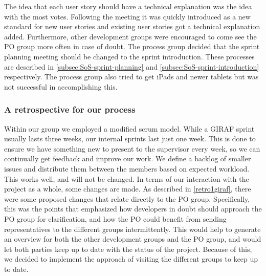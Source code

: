 The idea that each user story should have a technical explanation was the idea with the most votes. 
Following the meeting it was quickly introduced as a new standard for new user stories and existing user stories got a technical explanation added.
Furthermore, other development groups were encouraged to come see the PO group more often in case of doubt.
The process group decided that the sprint planning meeting should be changed to the sprint introduction.
These processes are described in \autoref{subsec:SoS-sprint-planning} and \autoref{subsec:SoS-sprint-introduction} respectively.
The process group also tried to get iPads and newer tablets but was not successful in accomplishing this.

\subsubsection{A retrospective for our process}
Within our group we employed a modified scrum model.
While a GIRAF sprint usually lasts three weeks, our internal sprints last just one week.
This is done to ensure we have something new to present to the supervisor every week, so we can continually get feedback and improve our work.
We define a backlog of smaller issues and distribute them between the members based on expected workload.
This works well, and will not be changed.
In terms of our interaction with the project as a whole, some changes are made.
As described in \autoref{retro1giraf}, there were some proposed changes that relate directly to the PO group.
Specifically, this was the points that emphasized how developers in doubt should approach the PO group for clarification, and how the PO could benefit from sending representatives to the different groups intermittently. 
This would help to generate an overview for both the other development groups and the PO group, and would let both parties keep up to date with the status of the project.
Because of this, we decided to implement the approach of visiting the different groups to keep up to date.
